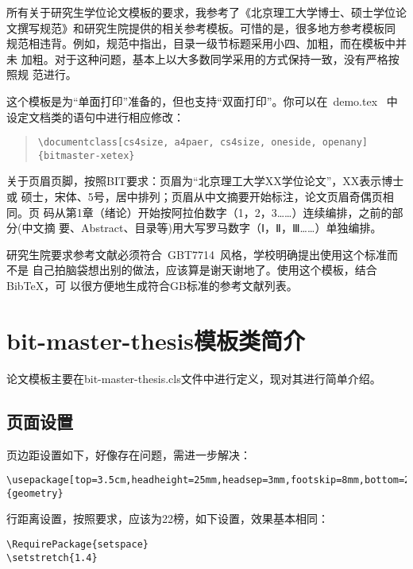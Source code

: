 所有关于研究生学位论文模板的要求，我参考了《北京理工大学博士、硕士学位论
  文撰写规范》和研究生院提供的相关参考模板。可惜的是，很多地方参考模板同
规范相违背。例如，规范中指出，目录一级节标题采用小四、加粗，而在模板中并未
加粗。对于这种问题，基本上以大多数同学采用的方式保持一致，没有严格按照规
范进行。

这个模板是为``单面打印''准备的，但也支持``双面打印''。你可以在~demo.tex~
中设定文档类的语句中进行相应修改：

\begin{quote}
  {\small\verb+\documentclass[cs4size, a4paer, cs4size, oneside, openany]{bitmaster-xetex}+}
\end{quote}


关于页眉页脚，按照BIT要求：页眉为``北京理工大学XX学位论文''，XX表示博士或
硕士，宋体、5号，居中排列；页眉从中文摘要开始标注，论文页眉奇偶页相同。页
码从第1章（绪论）开始按阿拉伯数字（1，2，3……）连续编排，之前的部分(中文摘
要、Abstract、目录等)用大写罗马数字（Ⅰ，Ⅱ，Ⅲ……）单独编排。

研究生院要求参考文献必须符合~GBT7714~风格，学校明确提出使用这个标准而不是
自己拍脑袋想出别的做法，应该算是谢天谢地了。使用这个模板，结合BibTeX，可
以很方便地生成符合GB标准的参考文献列表。

\section{bit-master-thesis模板类简介}
\label{sec:bit.cls}
论文模板主要在bit-master-thesis.cls文件中进行定义，现对其进行简单介绍。
\subsection{页面设置}
页边距设置如下，{\color{red}好像存在问题，需进一步解决}：
\begin{lstlisting}
\usepackage[top=3.5cm,headheight=25mm,headsep=3mm,footskip=8mm,bottom=2.5cm,left=2.7cm,right=2.7cm]{geometry}
\end{lstlisting}

行距离设置，按照要求，应该为22榜，如下设置，效果基本相同：
\begin{lstlisting}
\RequirePackage{setspace}
\setstretch{1.4}
\end{lstlisting}

